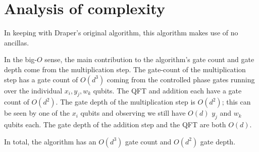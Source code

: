 \documentclass{article}
\theoremstyle{definition}
\theoremstyle{remark}
\begin{document}
	\section{Analysis of complexity}
	In keeping with Draper's original algorithm, this algorithm makes use of no ancillas. \par 
	In the big-$O$ sense, the main contribution to the algorithm's gate count and gate depth come from the multiplication step. The gate-count of the multiplication step has a gate count of $O(d^3)$ coming from the controlled phase gates running over the individual $x_i, y_j, w_k$ qubits. The QFT and addition each have a gate count of $O(d^2)$. The gate depth of the multiplication step is $O(d^2)$; this can be seen by one of the $x_i$ qubits and observing we still have $O(d)$ $y_j$ and $w_k$ qubits each. The gate depth of the addition step and the QFT are both $O(d)$. \par 
	In total, the algorithm has an $O(d^3)$ gate count and $O(d^2)$ gate depth. 
	
	
\end{document}
